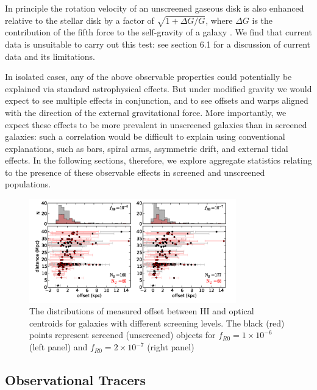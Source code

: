 \documentclass[useAMS,usenatbib,twocolumn]{mn2e}
\begin{document}
\begin{enumerate}
In principle the rotation velocity of an unscreened gaseous
disk is also enhanced relative to the stellar disk by a factor of
$\sqrt{1 + \Delta G/G}$, where $\Delta G$ is the contribution of the fifth force
to the self-gravity of a galaxy \citep{hui10}. 
We find that current data
is unsuitable to carry out this test: 
see section 6.1 for a discussion of current data and its limitations. 

\end{enumerate}

In isolated cases,
any of the above observable properties could potentially be explained via
standard astrophysical effects.  But under modified gravity we would expect
to see multiple effects in conjunction, and to see offsets and warps
aligned with the direction of the external gravitational force.
More importantly, we expect these effects to be more prevalent
in unscreened galaxies than in screened galaxies: such a correlation
would be difficult to explain using conventional explanations,
such as bars, spiral arms, asymmetric drift, and external tidal effects.
In the following sections, therefore, we explore aggregate statistics
relating to the presence of these observable effects in screened and
unscreened populations.  

\begin{figure}
\centering
\includegraphics[width=0.8\textwidth]{figures/Offset_HI_optical_scatter_jake.png}
\caption{The distributions of measured offset between HI and
optical centroids for galaxies with different screening levels.
The black (red) points represent screened (unscreened) objects for
$f_{R0}=1\times10^{-6}$ (left panel) and $f_{R0}=2\times10^{-7}$ (right panel)}
\label{fig:offset}
\end{figure}

\subsection{Observational Tracers}
\label{sec:halpha}
\end{document}

